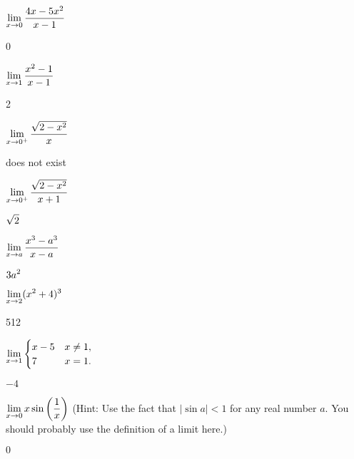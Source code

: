 \begin{exercises}
\begin{exercise} $\displaystyle \lim _{x\to 0 } {4x - 5x^2\over x-1}$
\begin{answer} 0
\end{answer}\end{exercise}

\begin{exercise} $\displaystyle\lim _{x\to 1 } {x^2 -1 \over x-1 }$
\begin{answer} 2
\end{answer}\end{exercise}

\begin{exercise} $\displaystyle\lim _{x\to 0^ + } {\sqrt{2-x^2 }\over x}$
\begin{answer} does not exist
\end{answer}\end{exercise}

\begin{exercise} $\displaystyle\lim _{x\to 0^ + } {\sqrt{2-x^2}\over x+1}$
\begin{answer} $\displaystyle \sqrt2$
\end{answer}\end{exercise}

\begin{exercise} $\displaystyle\lim _{x\to a } {x^3 -a^3\over x-a}$
\begin{answer} $\displaystyle 3a^2$
\end{answer}\end{exercise}

\begin{exercise} $\displaystyle\lim _{x\to 2 } (x^2 +4)^3$
\begin{answer} 512
\end{answer}\end{exercise}

\begin{exercise} $\displaystyle\lim _{x\to 1 } \begin{cases}
x-5 & x\neq 1, \\
7 & x=1. \end{cases}$
\begin{answer} $-4$
\end{answer}\end{exercise}

\endtwocol

\msk
\begin{exercise} $\displaystyle\lim _{x\to 0 } x\sin \left( {1\over x}\right)$
(Hint: Use the fact that $|\sin a |< 1 $ for any real number $a$. You
should probably use the definition of a limit here.)
\begin{answer} $0$
\end{answer}\end{exercise}


\end{exercises}
